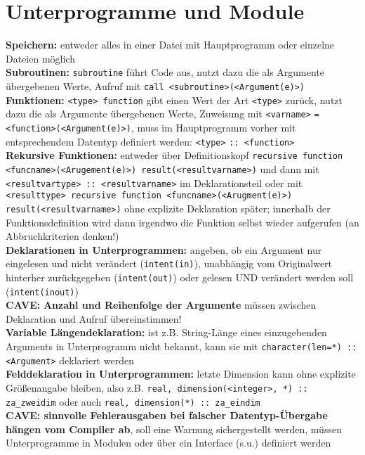 \documentclass[a4paper, twocolumn]{scrarticle}
\begin{document}
\section{Unterprogramme und Module}
\textbf{Speichern:} entweder alles in einer Datei mit Hauptprogramm oder einzelne Dateien möglich\\
\textbf{Subroutinen:} \lstinline|subroutine| führt Code aus, nutzt dazu die als Argumente übergebenen Werte, Aufruf mit \lstinline|call <subroutine>(<Argument(e)>)|\\
\textbf{Funktionen:} \lstinline|<type> function| gibt einen Wert der Art \lstinline|<type>| zurück, nutzt dazu die als Argumente übergebenen Werte, Zuweisung mit \lstinline|<varname>| \lstinline|= <function>(<Argument(e)>)|, muss im Hauptprogramm vorher mit entsprechendem Datentyp definiert werden: \lstinline|<type>| \lstinline|:: <function>|\\
\textbf{Rekursive Funktionen:} entweder über Definitionskopf \lstinline|recursive function <funcname>(<Arugement(e)>) result(<resultvarname>)| und dann mit \lstinline|<resultvartype> :: <resultvarname>| im Deklarationsteil oder mit \lstinline|<resulttype> recursive function <funcname>(<Arugment(e)>) result(<resultvarname>)| ohne explizite Deklaration später; innerhalb der Funktionsdefinition wird dann irgendwo die Funktion selbst wieder aufgerufen (an Abbruchkriterien denken!)\\
\textbf{Deklarationen in Unterprogrammen:}  angeben, ob ein Argument nur eingelesen und nicht verändert (\lstinline|intent(in)|), unabhängig vom Originalwert hinterher zurückgegeben (\lstinline|intent(out)|) oder gelesen UND verändert werden soll (\lstinline|intent(inout)|)\\
\textbf{CAVE:} \textbf{Anzahl und Reihenfolge der Argumente} müssen zwischen Deklaration und Aufruf übereinstimmen!\\
\textbf{Variable Längendeklaration:} ist z.B. String-Länge  eines einzugebenden Arguments in Unterprogramm nicht bekannt, kann sie mit \lstinline|character(len=*) :: <Argument>| deklariert werden\\
\textbf{Felddeklaration in Unterprogrammen:} letzte Dimension kann ohne explizite Größenangabe bleiben, also z.B. \lstinline|real, dimension(<integer>, *) :: za_zweidim| oder auch \lstinline|real, dimension(*) :: za_eindim|\\
\textbf{CAVE: sinnvolle Fehlerausgaben bei falscher Datentyp-Übergabe hängen vom Compiler ab}, soll eine Warnung sichergestellt werden, müssen Unterprogramme in Modulen oder über ein Interface (s.u.) definiert werden\\
\end{document}
